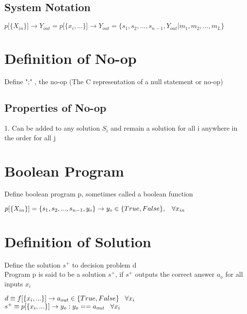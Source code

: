 \documentclass[11pt]{article}
\begin{document}
\subsection{System Notation}
\begin{center}
$
p\lbrack \{X_{in}\} \rbrack  \rightarrow Y_{out} = p\lbrack \{ x_i, ...\}\rbrack  \rightarrow Y_{out} = \{ s_1, s_2,...,s_{n-1}, Y_{out}|m_1, m_2,...,m_L \}
$
\end{center}


\section{Definition of No-op}
Define ";" , the no-op (The C representation of a null statement or no-op)
\subsection{Properties of No-op}
1. Can be added to any solution $S_i$ and remain a solution for all i anywhere in the order for all j




\section{Boolean Program}
Define boolean program p, sometimes called a boolean function
\begin{center}
$
p\lbrack \{X_{in}\}\rbrack = \{ s_1, s_2,...,s_{n-1}, y_o\} \rightarrow y_o \in \{ True, False \}, \hspace{3mm} \forall x_{in}
$
\end{center}







\section{Definition of Solution}
Define the solution $s^{+}$ to decision problem d\\
Program p is said to be a solution $s^{+}$, if $s^{+}$ outputs the correct answer $a_o$ for all inputs $x_i$
\begin{center}
$
d \equiv f \lbrack \{x_i,...\} \rbrack \rightarrow a_{out} \in \{True, False\} \hspace{3mm} \forall x_i
$
\\
$
s^+ \equiv p \lbrack \{x_i,...\} \rbrack \rightarrow y_{o} : y_o == a_{out} \hspace{3mm} \forall x_i
$
\end{center}
\end{document}
